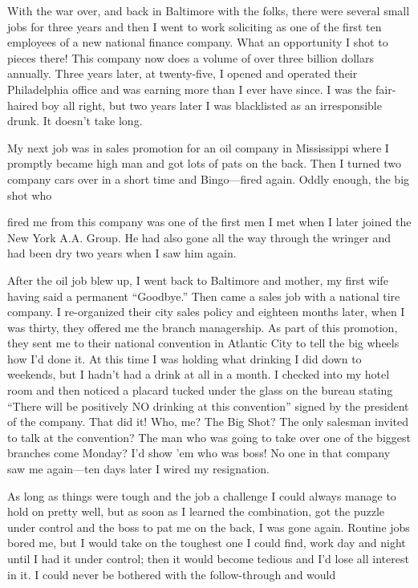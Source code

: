 \begin{biblechapter}
With the war over, and back in Baltimore with the folks, there were several small jobs for three years and then I went to work soliciting as one of the first ten employees of a new national finance company. What an opportunity I shot to pieces there! This company now does a volume of over three billion dollars annually. Three years later, at twenty-five, I opened and operated their Philadelphia office and was earning more than I ever have since. I was the fair-haired boy all right, but two years later I was blacklisted as an irresponsible drunk. It doesn’t take long.

My next job was in sales promotion for an oil company in Mississippi where I promptly became high man and got lots of pats on the back. Then I turned two company cars over in a short time and Bingo—fired again. Oddly enough, the big shot who

fired me from this company was one of the first men I met when I later joined the New York A.A. Group. He had also gone all the way through the wringer and had been dry two years when I saw him again.

After the oil job blew up, I went back to Baltimore and mother, my first wife having said a permanent “Goodbye.” Then came a sales job with a national tire company. I re-organized their city sales policy and eighteen months later, when I was thirty, they offered me the branch managership. As part of this promotion, they sent me to their national convention in Atlantic City to tell the big wheels how I’d done it. At this time I was holding what drinking I did down to weekends, but I hadn’t had a drink at all in a month. I checked into my hotel room and then noticed a placard tucked under the glass on the bureau stating “There will be positively NO drinking at this convention” signed by the president of the company. That did it! Who, me? The Big Shot? The only salesman invited to talk at the convention? The man who was going to take over one of the biggest branches come Monday? I’d show ’em who was boss! No one in that company saw me again—ten days later I wired my resignation.

As long as things were tough and the job a challenge I could always manage to hold on pretty well, but as soon as I learned the combination, got the puzzle under control and the boss to pat me on the back, I was gone again. Routine jobs bored me, but I would take on the toughest one I could find, work day and night until I had it under control; then it would become tedious and I’d lose all interest in it. I could never be bothered with the follow-through and would


\end{biblechapter}
